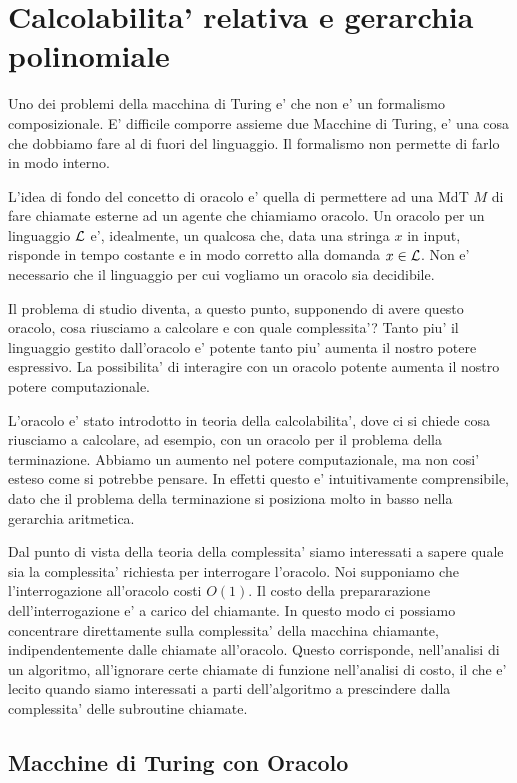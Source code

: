 \chapter{Calcolabilita' relativa e gerarchia polinomiale}

Uno dei problemi della macchina di Turing e' che non e' un formalismo composizionale. E' difficile
comporre assieme due Macchine di Turing, e' una cosa che dobbiamo fare al di fuori del linguaggio.
Il formalismo non permette di farlo in modo interno.

L'idea di fondo del concetto di oracolo e' quella di permettere ad una MdT $M$ di fare chiamate
esterne ad un agente che chiamiamo oracolo. Un oracolo per un linguaggio $\mathcal{L}$ e', idealmente, un
qualcosa che, data una stringa $x$ in input, risponde in tempo costante e in modo corretto alla
domanda $x \in \mathcal{L}$. Non e' necessario che il linguaggio per cui vogliamo un oracolo sia
decidibile.

Il problema di studio diventa, a questo punto, supponendo di avere questo oracolo, cosa riusciamo a
calcolare e con quale complessita'? Tanto piu' il linguaggio gestito dall'oracolo e' potente tanto
piu' aumenta il nostro potere espressivo. La possibilita' di interagire con un oracolo potente
aumenta il nostro potere computazionale.

L'oracolo e' stato introdotto in teoria della calcolabilita', dove ci si chiede cosa riusciamo a
calcolare, ad esempio, con un oracolo per il problema della terminazione. Abbiamo un aumento nel
potere computazionale, ma non cosi' esteso come si potrebbe pensare. In effetti questo e'
intuitivamente comprensibile, dato che il problema della terminazione si posiziona molto in basso
nella gerarchia aritmetica.

Dal punto di vista della teoria della complessita' siamo interessati a sapere quale sia la
complessita' richiesta per interrogare l'oracolo. Noi supponiamo che l'interrogazione all'oracolo
costi $O(1)$. Il costo della prepararazione dell'interrogazione e' a carico del chiamante. In questo
modo ci possiamo concentrare direttamente sulla complessita' della macchina chiamante,
indipendentemente dalle chiamate all'oracolo. Questo corrisponde, nell'analisi di un algoritmo,
all'ignorare certe chiamate di funzione nell'analisi di costo, il che e' lecito quando siamo
interessati a parti dell'algoritmo a prescindere dalla complessita' delle subroutine chiamate.

\section{Macchine di Turing con Oracolo}

